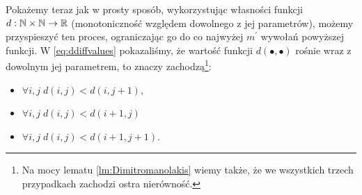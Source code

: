Pokażemy teraz jak w prosty sposób, wykorzystując własności funkcji $d: \mathbb{N} \times \mathbb{N} \rightarrow \mathbb{R}$ (monotoniczność względem dowolnego z jej parametrów), możemy przyspieszyć ten proces, ograniczając go do co najwyżej $m^{\prime}$ wywołań powyższej funkcji. W \ref{eq:ddiffvalues} pokazaliśmy, że wartość funkcji $d \left( \bullet, \bullet \right)$ rośnie wraz z dowolnym jej parametrem, to znaczy zachodzą\footnote{Na mocy lematu \ref{lm:Dimitromanolakis} wiemy także, że we wszystkich trzech przypadkach zachodzi ostra nierówność.}:

\begin{itemize}
	\item $\forall i, j \; d \left( i, j \right) < d \left( i, j + 1 \right)$,
	\item $\forall i, j \; d \left( i, j \right) < d \left( i + 1, j \right)$
	\item $\forall i, j \; d \left( i, j \right) < d \left( i + 1, j + 1 \right)$.
\end{itemize}

